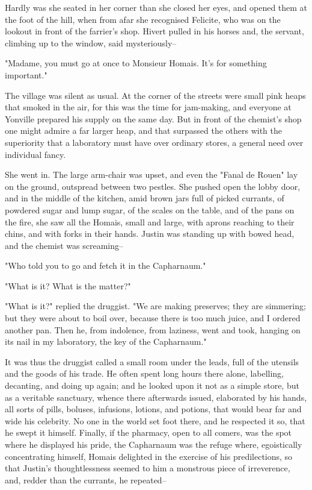 \documentclass[11pt,twocolumn]{ltugboat}
\begin{document}
Hardly was she seated in her corner than she closed her eyes, and opened
them at the foot of the hill, when from afar she recognised Felicite,
who was on the lookout in front of the farrier's shop. Hivert pulled
in his horses and, the servant, climbing up to the window, said
mysteriously--

"Madame, you must go at once to Monsieur Homais. It's for something
important."

The village was silent as usual. At the corner of the streets were small
pink heaps that smoked in the air, for this was the time for jam-making,
and everyone at Yonville prepared his supply on the same day. But in
front of the chemist's shop one might admire a far larger heap, and that
surpassed the others with the superiority that a laboratory must have
over ordinary stores, a general need over individual fancy.

She went in. The large arm-chair was upset, and even the "Fanal de
Rouen" lay on the ground, outspread between two pestles. She pushed open
the lobby door, and in the middle of the kitchen, amid brown jars full
of picked currants, of powdered sugar and lump sugar, of the scales on
the table, and of the pans on the fire, she saw all the Homais, small
and large, with aprons reaching to their chins, and with forks in their
hands. Justin was standing up with bowed head, and the chemist was
screaming--

"Who told you to go and fetch it in the Capharnaum."

"What is it? What is the matter?"

"What is it?" replied the druggist. "We are making preserves; they are
simmering; but they were about to boil over, because there is too
much juice, and I ordered another pan. Then he, from indolence, from
laziness, went and took, hanging on its nail in my laboratory, the key
of the Capharnaum."

It was thus the druggist called a small room under the leads, full of
the utensils and the goods of his trade. He often spent long hours there
alone, labelling, decanting, and doing up again; and he looked upon
it not as a simple store, but as a veritable sanctuary, whence there
afterwards issued, elaborated by his hands, all sorts of pills, boluses,
infusions, lotions, and potions, that would bear far and wide his
celebrity. No one in the world set foot there, and he respected it so,
that he swept it himself. Finally, if the pharmacy, open to all comers,
was the spot where he displayed his pride, the Capharnaum was the refuge
where, egoistically concentrating himself, Homais delighted in the
exercise of his predilections, so that Justin's thoughtlessness seemed
to him a monstrous piece of irreverence, and, redder than the currants,
he repeated--
\end{document}
